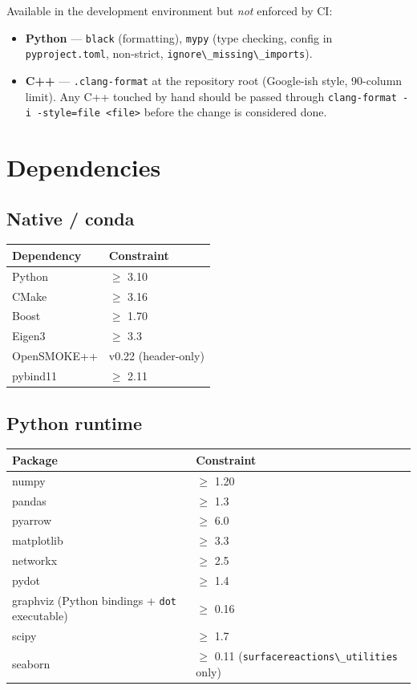 \documentclass[11pt,a4paper]{report}
\newcommand{\pkg}[1]{\lstinline|#1|}
\begin{document}
Available in the development environment but \emph{not} enforced by CI:
\begin{itemize}
\item \textbf{Python} --- \pkg{black} (formatting), \pkg{mypy} (type
  checking, config in \pkg{pyproject.toml}, non-strict,
  \pkg{ignore\_missing\_imports}).
\item \textbf{C++} --- \pkg{.clang-format} at the repository root
  (Google-ish style, 90-column limit). Any C++ touched by hand should be
  passed through \pkg{clang-format -i -style=file <file>} before the change
  is considered done.
\end{itemize}

\chapter{Dependencies}

\section{Native / conda}
\begin{center}
\begin{tabular}{ll}
\toprule
Dependency & Constraint \\
\midrule
Python & $\geq$ 3.10 \\
CMake & $\geq$ 3.16 \\
Boost & $\geq$ 1.70 \\
Eigen3 & $\geq$ 3.3 \\
OpenSMOKE++ & v0.22 (header-only) \\
pybind11 & $\geq$ 2.11 \\
\bottomrule
\end{tabular}
\end{center}

\section{Python runtime}
\begin{center}
\begin{tabular}{ll}
\toprule
Package & Constraint \\
\midrule
numpy & $\geq$ 1.20 \\
pandas & $\geq$ 1.3 \\
pyarrow & $\geq$ 6.0 \\
matplotlib & $\geq$ 3.3 \\
networkx & $\geq$ 2.5 \\
pydot & $\geq$ 1.4 \\
graphviz (Python bindings + \pkg{dot} executable) & $\geq$ 0.16 \\
scipy & $\geq$ 1.7 \\
seaborn & $\geq$ 0.11 \quad(\pkg{surfacereactions\_utilities} only) \\
\bottomrule
\end{tabular}
\end{center}
\end{document}
